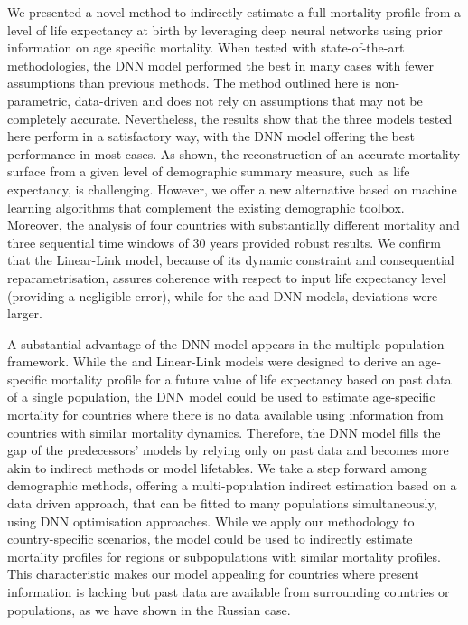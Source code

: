 \documentclass[a4,11pt]{article}
\begin{document}
We presented a novel method to indirectly estimate a full mortality profile from a level of life expectancy at birth by leveraging deep neural networks using prior information on age specific mortality. When tested with state-of-the-art methodologies, the DNN model performed the best in many cases with fewer assumptions than previous methods.
The method outlined here is non-parametric, data-driven and does not rely on assumptions that may not be completely accurate. Nevertheless, the results show that the three models tested here perform in a satisfactory way, with the DNN model offering the best performance in most cases. 
As shown, the reconstruction of an accurate mortality surface from a given level of demographic summary measure, such as life expectancy, is challenging. However, we offer a new alternative based on machine learning algorithms that complement the existing demographic toolbox. Moreover, the analysis of four countries with substantially different mortality and three sequential time windows of 30 years provided robust results. 
We confirm that the Linear-Link model, because of its dynamic constraint and consequential reparametrisation, assures coherence with respect to input life expectancy level (providing a negligible error), while for the \citet{Sevcikova} and DNN models, deviations were larger. 

A substantial advantage of the DNN model appears in the multiple-population framework. While the \citet{Sevcikova} and Linear-Link models were designed to derive an age-specific mortality profile for a future value of life expectancy based on past data of a single population, the DNN model could be used to estimate age-specific mortality for countries where there is no data available using information from countries with similar mortality dynamics. Therefore, the DNN model fills the gap of the predecessors' models by relying only on past data and becomes more akin to indirect methods or model lifetables. We take a step forward among demographic methods, offering a multi-population indirect estimation based on a data driven approach, that can be fitted to many populations simultaneously, using DNN optimisation approaches.
While we apply our methodology to country-specific scenarios, the model could be used to indirectly estimate mortality profiles for regions or subpopulations with similar mortality profiles. This characteristic makes our model appealing for countries where present information is lacking but past data are available from surrounding countries or populations, as we have shown in the Russian case. 
\end{document}

